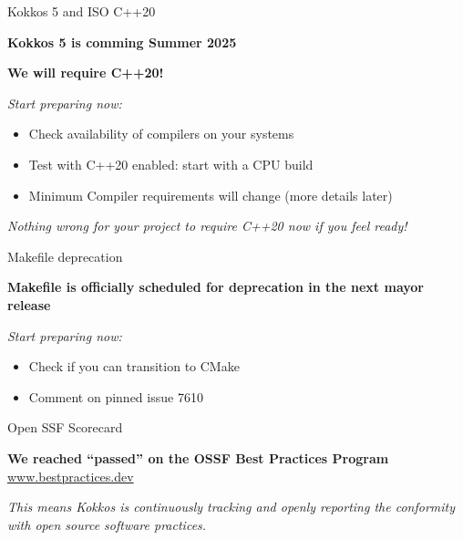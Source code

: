\begin{frame}[fragile]{Kokkos 5 and ISO C++20}
\begin{center}
\textbf{Kokkos 5 is comming Summer 2025}

\vspace{0.5cm}
\textbf{We will require C++20!}
\end{center}

\textit{Start preparing now:}
\begin{itemize}
  \item{Check availability of compilers on your systems}
  \item{Test with C++20 enabled: start with a CPU build}
  \item{Minimum Compiler requirements will change (more details later)}
\end{itemize}

\vspace{0.5cm}
\begin{center}
\textit{Nothing wrong for your project to require C++20 now if you feel ready!}
\end{center}
\end{frame}

\begin{frame}[fragile]{Makefile deprecation}
\begin{center}
\textbf{Makefile is officially scheduled for deprecation in the next mayor release}

\textit{Start preparing now:}
\begin{itemize}
  \item{Check if you can transition to CMake}
  \item{Comment on pinned issue 7610}
\end{itemize}
\end{center}

\end{frame}

\begin{frame}[fragile]{Open SSF Scorecard}
\begin{center}
\textbf{We reached ``passed'' on the OSSF Best Practices Program}
\href{https://www.bestpractices.dev/en/projects/9344}{www.bestpractices.dev}

\vspace{0.5cm}
\textit{This means Kokkos is continuously tracking and openly reporting the conformity with open source software practices.}
\end{center}

\end{frame}
